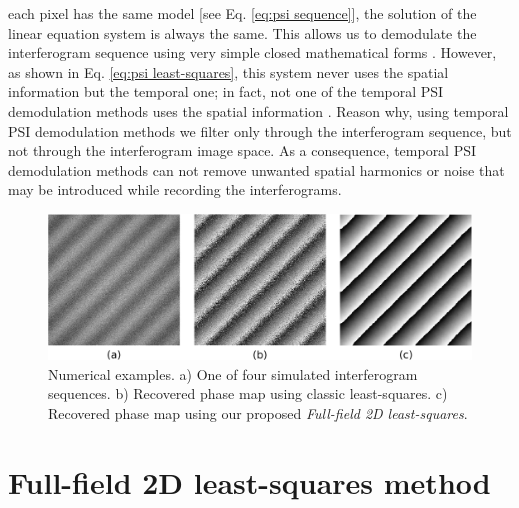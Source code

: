 each pixel has the same model [see Eq. \eqref{eq:psi sequence}], the
solution of the linear equation system is always the same. This
allows us to demodulate the interferogram sequence using very simple
closed mathematical forms \cite{Malacara}. However, as shown in
Eq. \eqref{eq:psi least-squares}, this system never uses the spatial
information but the temporal one; in fact, not one of the temporal PSI
demodulation methods uses the spatial information \cite{GeneralTheory}. Reason
why, using temporal PSI demodulation methods we filter only through the 
interferogram sequence, but not through the interferogram image space. As a 
consequence, temporal PSI demodulation methods can not remove unwanted spatial
harmonics or noise that may be introduced while recording the interferograms.
\begin{figure}[th!]
	\begin{center}
		\includegraphics[scale=0.2]{Chpt1_figures/Fig_1.eps}
	\end{center}
	\caption{Numerical examples. a) One of four simulated 
	interferogram sequences. b) Recovered phase map using classic 
	least-squares. c) Recovered phase map using our proposed 
	\textit{Full-field 2D least-squares}.} 
	\label{fig:SimPhaseComparison}
\end{figure}

\section{Full-field 2D least-squares method}

